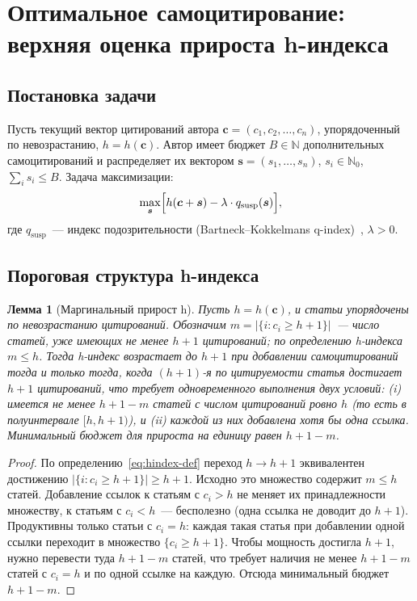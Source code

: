 \documentclass[12pt,a4paper]{article}
\newtheorem{lemma}{Лемма}
\theoremstyle{definition}
\newcommand{\N}{\mathbb{N}}
\begin{document}
\section{Оптимальное самоцитирование: верхняя оценка прироста h-индекса}
\label{sec:selfcite}

\subsection{Постановка задачи}

Пусть текущий вектор цитирований автора $\bm{c} = (c_1, c_2, \dots,
c_n)$, упорядоченный по невозрастанию, $h = h(\bm{c})$. Автор имеет
бюджет $B \in \N$ дополнительных самоцитирований и распределяет их
вектором $\bm{s} = (s_1, \dots, s_n)$, $s_i \in \N_0$, $\sum_i s_i
\leq B$. Задача максимизации:
\begin{equation}
  \max_{\bm{s}} \Bigl[ h(\bm{c} + \bm{s}) - \lambda \cdot
  q_{\mathrm{susp}}(\bm{s}) \Bigr],
  \label{eq:selfcite-problem}
\end{equation}
где $q_{\mathrm{susp}}$~--- индекс подозрительности
(Bartneck--Kokkelmans q-index)~\citep{bartneck2011}, $\lambda > 0$.

\subsection{Пороговая структура h-индекса}

\begin{lemma}[Маргинальный прирост h]
  \label{lemma:marginal}
  Пусть $h = h(\bm{c})$, и статьи упорядочены по невозрастанию
  цитирований. Обозначим $m = |\{i : c_i \geq h+1\}|$~--- число
  статей, уже имеющих не менее $h+1$ цитирований; по определению
  h-индекса $m \leq h$. Тогда h-индекс возрастает до $h+1$ при
  добавлении самоцитирований тогда и только тогда, когда $(h+1)$-я по
  цитируемости статья достигает $h+1$ цитирований, что требует
  одновременного выполнения двух условий: \textup{(i)} имеется не
  менее $h+1-m$ статей с числом цитирований ровно $h$ (то есть в
  полуинтервале $[h, h+1)$), и \textup{(ii)} каждой из них добавлена
  хотя бы одна ссылка. Минимальный бюджет для прироста на единицу равен $h+1-m$.
\end{lemma}

\begin{proof}
  По определению~\eqref{eq:hindex-def} переход $h \to h+1$
  эквивалентен достижению $|\{i : c_i \geq h+1\}| \geq h+1$. Исходно
  это множество содержит $m \leq h$ статей. Добавление ссылок к
  статьям с $c_i > h$ не меняет их принадлежности множеству, к
  статьям с $c_i < h$~--- бесполезно (одна ссылка не доводит до
  $h+1$). Продуктивны только статьи с $c_i = h$: каждая такая статья
  при добавлении одной ссылки переходит в множество $\{c_i \geq
  h+1\}$. Чтобы мощность достигла $h+1$, нужно перевести туда $h+1-m$
  статей, что требует наличия не менее $h+1-m$ статей с $c_i = h$ и
  по одной ссылке на каждую. Отсюда минимальный бюджет $h+1-m$.
\end{proof}
\end{document}
